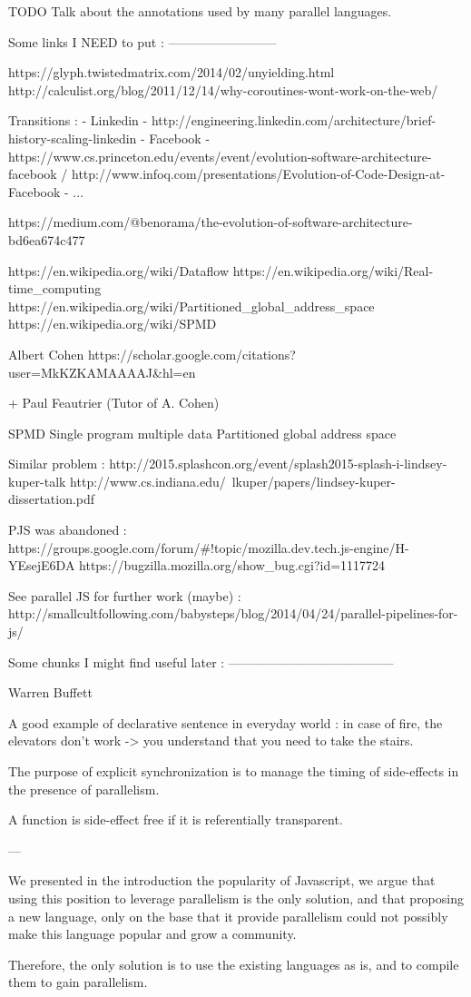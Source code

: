 TODO Talk about the annotations used by many parallel languages.



Some links I NEED to put :
--------------------------

https://glyph.twistedmatrix.com/2014/02/unyielding.html
http://calculist.org/blog/2011/12/14/why-coroutines-wont-work-on-the-web/

Transitions :
  - Linkedin - http://engineering.linkedin.com/architecture/brief-history-scaling-linkedin
  - Facebook - https://www.cs.princeton.edu/events/event/evolution-software-architecture-facebook / http://www.infoq.com/presentations/Evolution-of-Code-Design-at-Facebook
  - ... 

https://medium.com/@benorama/the-evolution-of-software-architecture-bd6ea674c477

https://en.wikipedia.org/wiki/Dataflow
https://en.wikipedia.org/wiki/Real-time_computing
https://en.wikipedia.org/wiki/Partitioned_global_address_space
https://en.wikipedia.org/wiki/SPMD

Albert Cohen
https://scholar.google.com/citations?user=MkKZKAMAAAAJ&hl=en

+ Paul Feautrier (Tutor of A. Cohen)


SPMD Single program multiple data
Partitioned global address space


Similar problem :
http://2015.splashcon.org/event/splash2015-splash-i-lindsey-kuper-talk
http://www.cs.indiana.edu/~lkuper/papers/lindsey-kuper-dissertation.pdf

PJS was abandoned :
https://groups.google.com/forum/#!topic/mozilla.dev.tech.js-engine/H-YEsejE6DA
https://bugzilla.mozilla.org/show_bug.cgi?id=1117724

See parallel JS for further work (maybe) :
http://smallcultfollowing.com/babysteps/blog/2014/04/24/parallel-pipelines-for-js/

Some chunks I might find useful later :
---------------------------------------

{Warren Buffett}

A good example of declarative sentence in everyday world : in case of fire, 
the elevators don't work -> you understand that you need to take the stairs.

The purpose of explicit synchronization is to manage the timing of side-effects in the presence of parallelism. 

A function is side-effect free if it is referentially transparent.



---


We presented in the introduction the popularity of Javascript, we argue that using this position to leverage parallelism is the only solution, and that proposing a new language, only on the base that it provide parallelism could not possibly make this language popular and grow a community.

Therefore, the only solution is to use the existing languages as is, and to compile them to gain parallelism.